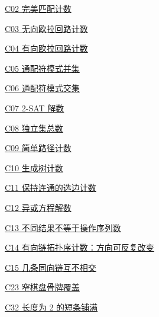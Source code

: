 \documentclass[10pt,a4paper]{article}
\begin{document}
\noindent\hyperref[C02]{C02 完美匹配计数\nobreak\hfill\pageref*{C02}}\par\vspace{1.5pt}
\noindent\hyperref[C03]{C03 无向欧拉回路计数\nobreak\hfill\pageref*{C03}}\par\vspace{1.5pt}
\noindent\hyperref[C04]{C04 有向欧拉回路计数\nobreak\hfill\pageref*{C04}}\par\vspace{1.5pt}
\noindent\hyperref[C05]{C05 通配符模式并集\nobreak\hfill\pageref*{C05}}\par\vspace{1.5pt}
\noindent\hyperref[C06]{C06 通配符模式交集\nobreak\hfill\pageref*{C06}}\par\vspace{1.5pt}
\noindent\hyperref[C07]{C07 2-SAT 解数\nobreak\hfill\pageref*{C07}}\par\vspace{1.5pt}
\noindent\hyperref[C08]{C08 独立集总数\nobreak\hfill\pageref*{C08}}\par\vspace{1.5pt}
\noindent\hyperref[C09]{C09 简单路径计数\nobreak\hfill\pageref*{C09}}\par\vspace{1.5pt}
\noindent\hyperref[C10]{C10 生成树计数\nobreak\hfill\pageref*{C10}}\par\vspace{1.5pt}
\noindent\hyperref[C11]{C11 保持连通的选边计数\nobreak\hfill\pageref*{C11}}\par\vspace{1.5pt}
\noindent\hyperref[C12]{C12 异或方程解数\nobreak\hfill\pageref*{C12}}\par\vspace{1.5pt}
\noindent\hyperref[C13]{C13 不同结果不等于操作序列数\nobreak\hfill\pageref*{C13}}\par\vspace{1.5pt}
\noindent\hyperref[C14]{C14 有向链拓扑序计数：方向可反复改变\nobreak\hfill\pageref*{C14}}\par\vspace{1.5pt}
\noindent\hyperref[C15]{C15 几条同向链互不相交\nobreak\hfill\pageref*{C15}}\par\vspace{1.5pt}
\noindent\hyperref[C23]{C23 窄棋盘骨牌覆盖\nobreak\hfill\pageref*{C23}}\par\vspace{1.5pt}
\noindent\hyperref[C32]{C32 长度为 2 的短条铺满\nobreak\hfill\pageref*{C32}}\par\vspace{1.5pt}
\end{document}
